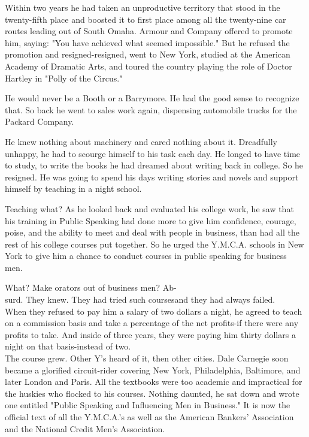 \documentclass[10pt]{article}
\begin{document}
Within two years he had taken an unproductive territory that stood in the twenty-fifth place and boosted it to first place among all the twenty-nine car routes leading out of South Omaha. Armour and Company offered to promote him, saying: "You have achieved what seemed impossible." But he refused the promotion and resigned-resigned, went to New York, studied at the American Academy of Dramatic Arts, and toured the country playing the role of Doctor Hartley in "Polly of the Circus."

He would never be a Booth or a Barrymore. He had the good sense to recognize that. So back he went to sales work again, dispensing automobile trucks for the Packard Company.

He knew nothing about machinery and cared nothing about it. Dreadfully unhappy, he had to scourge himself to his task each day. He longed to have time to study, to write the books he had dreamed about writing back in college. So he resigned. He was going to spend his days writing stories and novels and support himself by teaching in a night school.

Teaching what? As he looked back and evaluated his college work, he saw that his training in Public Speaking had done more to give him confidence, courage, poise, and the ability to meet and deal with people in business, than had all the rest of his college courses put together. So he urged the Y.M.C.A. schools in New York to give him a chance to conduct courses in public speaking for business men.

What? Make orators out of business men? Ab-\\
surd. They knew. They had tried such coursesand they had always failed.\\
When they refused to pay him a salary of two dollars a night, he agreed to teach on a commission basis and take a percentage of the net profits-if there were any profits to take. And inside of three years, they were paying him thirty dollars a night on that basis-instead of two.\\
The course grew. Other Y's heard of it, then other cities. Dale Carnegie soon became a glorified circuit-rider covering New York, Philadelphia, Baltimore, and later London and Paris. All the textbooks were too academic and impractical for the huskies who flocked to his courses. Nothing daunted, he sat down and wrote one entitled "Public Speaking and Influencing Men in Business." It is now the official text of all the Y.M.C.A.'s as well as the American Bankers' Association and the National Credit Men's Association.
\end{document}
